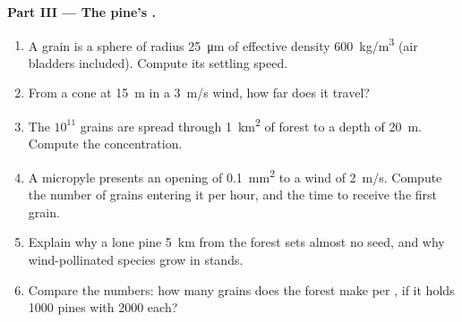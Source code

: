 \begin{problem}
\medskip
\noindent\textbf{Part III --- The pine's .}
\begin{enumerate}[resume]
  \item A  grain is a sphere of radius \qty{25}{\micro m} of
        effective density \qty{600}{kg/m^3} (air bladders included).
        Compute its settling speed.
  \item From a cone at \qty{15}{m} in a \qty{3}{m/s} wind, how far
        does it travel?
  \item The $10^{11}$ grains are spread through \qty{1}{km^2} of
        forest to a depth of \qty{20}{m}. Compute the concentration.
  \item A micropyle presents an opening of \qty{0.1}{mm^2} to a wind
        of \qty{2}{m/s}. Compute the number of grains entering it per
        hour, and the time to receive the first grain.
  \item Explain why a lone pine \qty{5}{km} from the forest sets
        almost no seed, and why wind-pollinated species grow in
        stands.
  \item Compare the numbers: how many  grains does the forest
        make per , if it holds \num{1000} pines with \num{2000}
         each?
\end{enumerate}


\end{problem}
